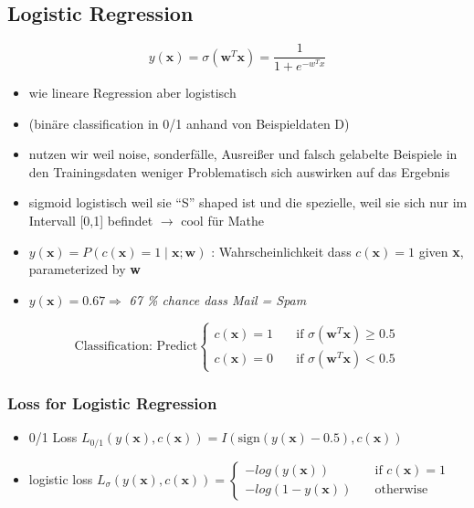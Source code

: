 \documentclass[11pt,a4paper]{article}
\begin{document}
\begin{flushleft}
\subsection{Logistic Regression}
$$ y(\textbf{x}) = \sigma (\textbf{w}^{T} \textbf{x}) = \frac{1}{1+ e^{-w^Tx}} $$
\begin{itemize}
\item wie lineare Regression aber logistisch
\item(binäre classification in 0/1 anhand von Beispieldaten D)
\item nutzen wir weil noise, sonderfälle, Ausreißer und falsch gelabelte Beispiele in den Trainingsdaten weniger Problematisch sich auswirken auf das Ergebnis
\item sigmoid logistisch weil sie “S” shaped ist und die spezielle, weil sie sich nur im Intervall [0,1] befindet $\rightarrow$ cool für Mathe
\item $y(\textbf{x}) = P(c(\textbf{x})= 1 \mid \textbf{x};\textbf{w})$ : Wahrscheinlichkeit dass $c(\textbf{x}) = 1$ given \textbf{x}, parameterized by \textbf{w}
\item $ y(\textbf{x}) = 0.67 \Rightarrow $ \textit{67 \% chance dass Mail = Spam }
\end{itemize}

$$ \text{Classification: Predict} \begin{cases}
c(\textbf{x}) = 1      & \quad \text{if } \sigma (\textbf{w}^T \textbf{x}) \geq 0.5 \\
c(\textbf{x}) = 0    & \quad \text{if } \sigma (\textbf{w}^T \textbf{x}) < 0.5
\end{cases} $$
\subsubsection{Loss for Logistic Regression}
\begin{itemize}
\item 0/1 Loss $ L_{0/1} (y(\textbf{x}), c(\textbf{x})) = I (\text{sign} (y(\textbf{x})-0.5) , c(\textbf{x})) $
\item logistic loss $  L_{\sigma} (y(\textbf{x}), c(\textbf{x})) = \begin{cases}
-log(y(\textbf{x}))      & \quad \text{if } c(\textbf{x}) = 1 \\
-log(1 - y(\textbf{x}))      & \quad \text{otherwise }
\end{cases} $
\end{itemize}

\end{flushleft}
\end{document}
